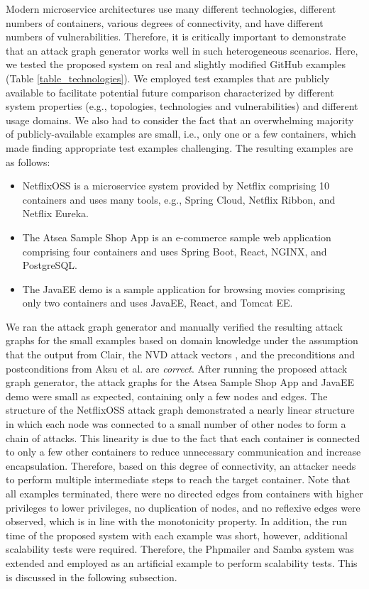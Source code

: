 Modern microservice architectures use many different technologies,  different numbers of containers, various degrees of connectivity, and have different numbers of vulnerabilities. Therefore, it is critically important to demonstrate that an attack graph generator works well in such heterogeneous scenarios. Here, we tested the proposed system on real and slightly modified GitHub examples (Table \ref{table_technologies}). We employed test examples that are publicly available to facilitate potential future comparison characterized by different system properties (e.g., topologies, technologies and vulnerabilities) and different usage domains. We also had to consider the fact that an overwhelming majority of publicly-available examples are small, i.e., only one or a few containers, which made finding appropriate test examples challenging. The resulting examples are as follows:

\begin{itemize}
	\item NetflixOSS is a microservice system provided by Netflix comprising 10 containers and uses many tools, e.g., Spring Cloud, Netflix Ribbon, and Netflix Eureka.
	\item The Atsea Sample Shop App is an e-commerce sample web application comprising four containers and uses Spring Boot, React, NGINX, and PostgreSQL.
	\item The JavaEE demo is a sample application for browsing movies comprising only two containers and uses JavaEE, React, and Tomcat EE.
\end{itemize}

   We ran the attack graph generator and manually verified the resulting attack graphs for the small examples based on domain knowledge under the assumption that the output from Clair, the NVD attack vectors \cite{booth2013national}, and the preconditions and postconditions from Aksu et al. \cite{aksu2018automated} are \textit{correct}. After running the proposed attack graph generator, the attack graphs for the Atsea Sample Shop App and JavaEE demo were small as expected, containing only a few nodes and edges. The structure of the NetflixOSS attack graph demonstrated a nearly linear structure in which each node was connected to a small number of other nodes to form a chain of attacks. This linearity is due to the fact that each container is connected to only a few other containers to reduce unnecessary communication and increase encapsulation. Therefore, based on this degree of connectivity, an attacker needs to perform multiple intermediate steps to reach the target container. Note that all examples terminated, there were no directed edges from containers with higher privileges to lower privileges, no duplication of nodes, and no reflexive edges were observed, which is in line with the monotonicity property. In addition, the run time of the proposed system with each example was short, however, additional scalability tests were required. Therefore, the Phpmailer and Samba system was extended and employed as an artificial example to perform scalability tests. This is discussed in the following subsection.



